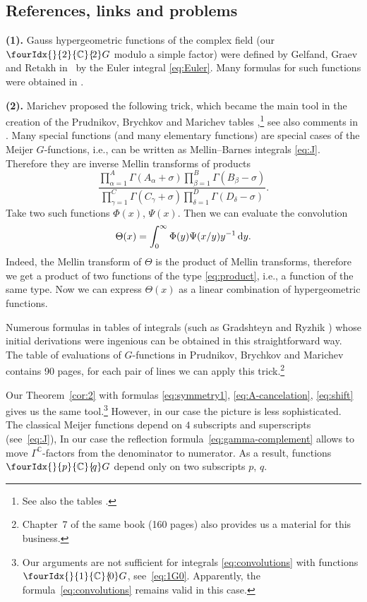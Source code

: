 \documentclass[pdftex]{sigma}
\numberwithin{equation}{section}
\newcommand{\Gc}[2]{\fourIdx{}{#1}{\C}{\!#2}G}
\def\C {{\mathbb C }}
\begin{document}
\subsection{References, links and problems}\label{ss:generalities}

\textbf{(1).}
Gauss hypergeometric functions of the complex field (our $\Gc{2}{2}$
modulo a simple factor)
were defined by Gelfand, Graev and Retakh in~\cite{GGR}
by the Euler integral \eqref{eq:Euler}.
Many formulas for such functions were obtained in \cite[Section~3]{MN}.

 \textbf{(2).} Marichev \cite{Mar} proposed the following trick, which became the main tool
in the creation of the Prudnikov, Brychkov and Marichev
tables \cite{PBM},\footnote{See also the tables \cite{BMSa}.}
see also comments in \cite{PBM-VINITI}.
Many special functions (and many elementary functions)
are special cases of the Meijer $G$-functions, i.e.,
can be written as Mellin--Barnes integrals \eqref{eq:J}.
Therefore they are inverse Mellin transforms of products
\begin{equation}
\frac{\prod\limits_{\alpha=1}^A\Gamma(A_\alpha+\sigma)
\prod\limits_{\beta=1}^B\Gamma(B_\beta-\sigma)}
{\prod\limits_{\gamma=1}^C\Gamma(C_\gamma+\sigma)
\prod\limits_{\delta=1}^D\Gamma(D_\delta-\sigma)}.
\label{eq:product}
\end{equation}
Take two such functions $\Phi(x)$, $\Psi(x)$. Then
we can evaluate the convolution
\[
\Theta(x)=\int_0^\infty \Phi(y)\Psi(x/y)y^{-1} \,{\rm d}y.
\]
Indeed, the Mellin transform of $\Theta$ is the product of
Mellin transforms, therefore we get a product of two functions
of the type \eqref{eq:product}, i.e., a function
of the same type. Now we can express $\Theta(x)$ as a linear
combination of hypergeometric functions.

Numerous formulas in tables of integrals (such as Gradshteyn and
Ryzhik \cite{GR})
whose initial derivations were ingenious can be obtained in this
straightforward way.
The table of evaluations of $G$-functions in Prudnikov, Brychkov and
Marichev \cite[Vol.~3, Section~8.4]{PBM} contains 90 pages,
for each pair of lines we can apply this trick.\footnote{Chapter~7 of the
same book (160 pages) also provides us a material for this business.}

Our Theorem~\ref{cor:2} with formulas
\eqref{eq:symmetry1}, \eqref{eq:A-cancelation}, \eqref{eq:shift}
gives us the same tool.\footnote{Our arguments are not sufficient
for integrals \eqref{eq:convolutions} with functions
$\Gc{1}{0}$, see~\eqref{eq:1G0}. Apparently, the formula~\eqref{eq:convolutions} remains valid in this case.}
However, in our case the picture is less sophisticated.
The classical Meijer functions depend on $4$ subscripts and
superscripts (see~\eqref{eq:J}),
In our case the reflection formula~\eqref{eq:gamma-complement}
allows to move $\Gamma^\C$-factors from the denominator to numerator.
As a result, functions $\Gc{p}{q}$ depend only on two subscripts $p$, $q$.
\end{document}
